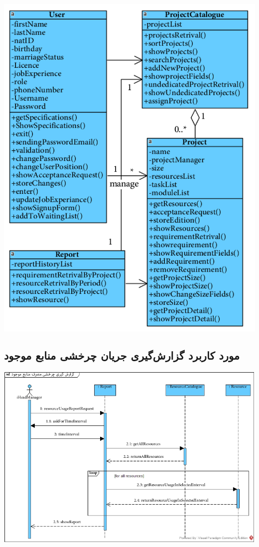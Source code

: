 \newpage
\vspace{2cm}
\begin{center}
\includegraphics[width=\textwidth]{SequenceClasses/40.png}
\end{center}

\newpage
\vspace{2cm}
\subsection*{مورد کاربرد گزارش‌گیری جریان چرخشی منابع موجود}
\vspace{2cm}
\begin{center}
\includegraphics[width=\textwidth]{SequenceDiagrams/41.jpg}
\end{center}

